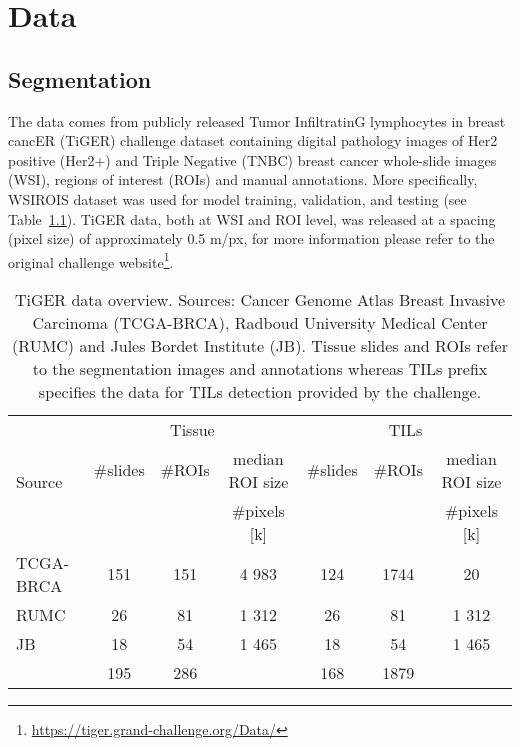 \chapter{Data}
\section{Segmentation}
The data comes from publicly released Tumor InfiltratinG lymphocytes in
breast cancER (TiGER) challenge dataset containing
digital pathology images of Her2 positive (Her2+) and Triple Negative (TNBC) breast
cancer whole-slide images (WSI), regions of interest (ROIs) and manual annotations. More specifically, WSIROIS dataset
was used for model training, validation, and testing (see Table~\ref*{tab:segm_data}).
TiGER data, both at WSI and ROI level, was released at a spacing (pixel size) of approximately 0.5 \textmu m/px,
for more information please refer to the original challenge
website\footnote{\url{https://tiger.grand-challenge.org/Data/}}.

\begin{table}[h!]
\centering
\begin{tabular}{ l c c c c c c } 
\hline
\multirow{3}{*}{Source} &  \multicolumn{3}{c}{Tissue} & \multicolumn{3}{c}{TILs}\\ 
\cline{2-7}
 & \#slides & \#ROIs & median ROI size & \#slides & \#ROIs & median ROI size \\ 
  & & & \#pixels [k] & & & \#pixels [k] \\ 
\hline
TCGA-BRCA & 151 & 151 & 4 983 & 124 & 1744 & 20\\ 
RUMC & 26 & 81 & 1 312 & 26 & 81 & 1 312\\ 
JB & 18 & 54 & 1 465 & 18 & 54 & 1 465\\
\hline
 & 195 & 286 & & 168 & 1879 &\\
\end{tabular}
\caption{\label{tab:segm_data}TiGER data overview. Sources: Cancer Genome Atlas Breast Invasive Carcinoma (TCGA-BRCA),
Radboud University Medical Center (RUMC) and Jules Bordet Institute (JB). Tissue slides and ROIs refer to the segmentation
images and annotations whereas TILs prefix specifies the data for TILs detection provided by the challenge. }
\end{table}

